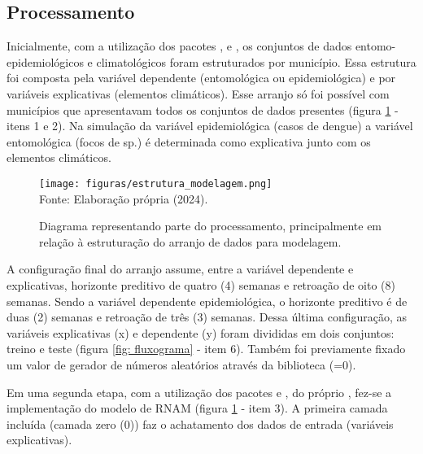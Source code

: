 \subsection{Processamento}

\indent Inicialmente, com a utilização dos pacotes ,  e  \cite{scikit-learn_2011_pedregosa, sklearn_2013_buitinck}, os conjuntos de dados entomo-epidemiológicos e climatológicos foram estruturados por município. Essa estrutura foi composta pela variável dependente (entomológica ou epidemiológica) e por variáveis explicativas (elementos climáticos). Esse arranjo só foi possível com municípios que apresentavam todos os conjuntos de dados presentes (figura \ref{fig: estrutura_modelagem} - itens 1 e 2). Na simulação da variável epidemiológica (casos de dengue) a variável entomológica (focos de  sp.) é determinada como explicativa junto com os elementos climáticos.

\begin{figure}[htbp]
    \centering
    \caption{Diagrama representando parte do processamento, principalmente em relação à estruturação do arranjo de dados para modelagem.}
    \texttt{[image: figuras/estrutura\_modelagem.png]}
    \label{fig: estrutura_modelagem}
    \\
    \vspace{-0.05cm}\hspace{-7.5cm}\small{Fonte: Elaboração própria (2024).} 
\end{figure}

\indent A configuração final do arranjo assume, entre a variável dependente e  explicativas, horizonte preditivo de quatro (4) semanas e retroação de oito (8) semanas. Sendo a variável dependente epidemiológica, o horizonte preditivo é de duas (2) semanas e retroação de três (3) semanas. Dessa última configuração, as variáveis explicativas (x) e dependente (y) foram divididas em dois conjuntos: treino e teste (figura \ref{fig: fluxograma} - item 6). Também foi previamente fixado um valor de gerador de números aleatórios através da biblioteca  (=0).

\indent Em uma segunda etapa, com a utilização dos pacotes  \cite{tensorflow_2015_whitepaper} e  \cite{keras_2015_chollet}, do próprio , fez-se a implementação do modelo de \acrfull{RNAM} (figura \ref{fig: estrutura_modelagem} - item 3). A primeira camada incluída (camada zero (0)) faz o achatamento dos dados de entrada (variáveis explicativas).

